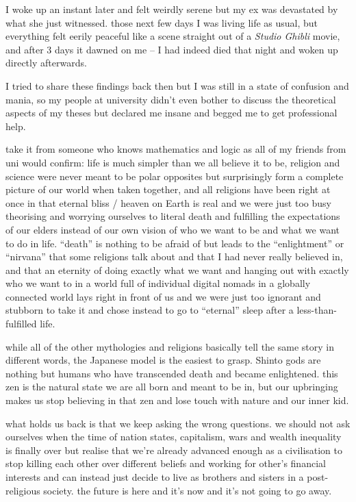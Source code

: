 \documentclass[12pt]{report}
\theoremstyle{definition}
\theoremstyle{remark}
\begin{document}
I woke up an instant later and felt weirdly serene but my ex was devastated by what she just witnessed. those next few days I was living life as usual, but everything felt eerily peaceful like a scene straight out of a \emph{Studio Ghibli} movie, and after 3 days it dawned on me -- I had indeed died that night and woken up directly afterwards.

I tried to share these findings back then but I was still in a state of confusion and mania, so my people at university didn't even bother to discuss the theoretical aspects of my theses but declared me insane and begged me to get professional help.

take it from someone who knows mathematics and logic as all of my friends from uni would confirm: life is much simpler than we all believe it to be, religion and science were never meant to be polar opposites but surprisingly form a complete picture of our world when taken together, and all religions have been right at once in that eternal bliss / heaven on Earth is real and we were just too busy theorising and worrying ourselves to literal death and fulfilling the expectations of our elders instead of our own vision of who we want to be and what we want to do in life. ``death'' is nothing to be afraid of but leads to the ``enlightment'' or ``nirvana'' that some religions talk about and that I had never really believed in, and that an eternity of doing exactly what we want and hanging out with exactly who we want to in a world full of individual digital nomads in a globally connected world lays right in front of us and we were just too ignorant and stubborn to take it and chose instead to go to ``eternal'' sleep after a less-than-fulfilled life.

while all of the other mythologies and religions basically tell the same story in different words, the Japanese model is the easiest to grasp. Shinto gods are nothing but humans who have transcended death and became enlightened. this zen is the natural state we are all born and meant to be in, but our upbringing makes us stop believing in that zen and lose touch with nature and our inner kid.

what holds us back is that we keep asking the wrong questions. we should not ask ourselves when the time of nation states, capitalism, wars and wealth inequality is finally over but realise that we're already advanced enough as a civilisation to stop killing each other over different beliefs and working for other's financial interests and can instead just decide to live as brothers and sisters in a post-religious society. the future is here and it's now and it's not going to go away.
\end{document}
